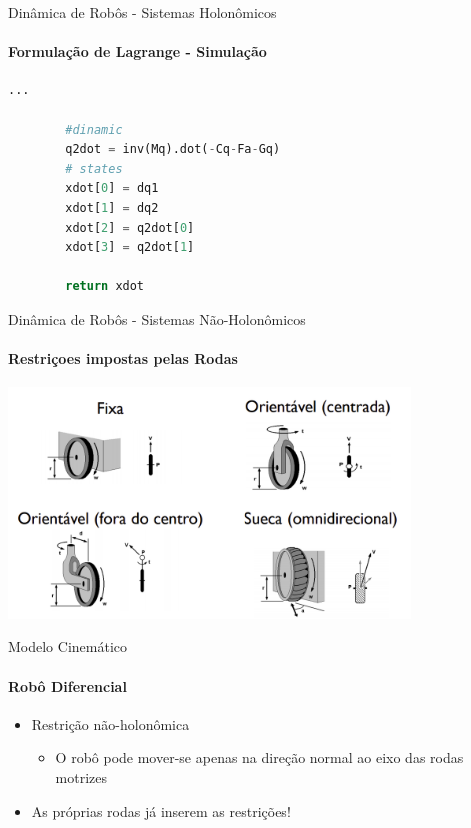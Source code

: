 \documentclass{beamer}
\begin{document}
\begin{frame}[fragile]{Dinâmica de Robôs - Sistemas Holonômicos}
    \framesubtitle{Formulação de Lagrange - Simulação}

	\begin{lstlisting}[language=Python]
        ...

        #dinamic
        q2dot = inv(Mq).dot(-Cq-Fa-Gq)
        # states
        xdot[0] = dq1
        xdot[1] = dq2
        xdot[2] = q2dot[0]
        xdot[3] = q2dot[1]

        return xdot
    \end{lstlisting}
    

\end{frame}



\begin{frame}{Dinâmica de Robôs - Sistemas Não-Holonômicos}
    \framesubtitle{Restriçoes impostas pelas Rodas}
    \begin{center}
        \includegraphics[width=0.8\textwidth]{./images/tipo_de_rodas.png}
    \end{center}
\end{frame}

\begin{frame}{Modelo Cinemático}
    \framesubtitle{Robô Diferencial}
    \begin{itemize}
        \item Restrição não-holonômica
              \begin{itemize}
                  \item O robô pode mover-se apenas na direção normal ao eixo das rodas motrizes
              \end{itemize}
        \item As próprias rodas já inserem as restrições!
    \end{itemize}
    \centering
    
\end{frame}
\end{document}
